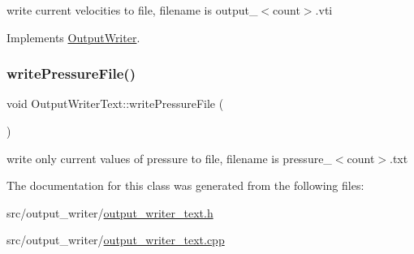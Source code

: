 write current velocities to file, filename is output\+\_\+$<$count$>$.\+vti 



Implements \mbox{\hyperlink{classOutputWriter_ac625c204affdc05919388a3549c2e945}{Output\+Writer}}.

\mbox{\label{classOutputWriterText_a3480b58a23fd158f16d0ef9c1b67cbfd}} 
\subsubsection{\texorpdfstring{writePressureFile()}{writePressureFile()}}
{\footnotesize\ttfamily void Output\+Writer\+Text\+::write\+Pressure\+File (\begin{DoxyParamCaption}{ }\end{DoxyParamCaption})}



write only current values of pressure to file, filename is pressure\+\_\+$<$count$>$.\+txt 



The documentation for this class was generated from the following files\+:\begin{DoxyCompactItemize}
\item 
src/output\+\_\+writer/\mbox{\hyperlink{output__writer__text_8h}{output\+\_\+writer\+\_\+text.\+h}}\item 
src/output\+\_\+writer/\mbox{\hyperlink{output__writer__text_8cpp}{output\+\_\+writer\+\_\+text.\+cpp}}\end{DoxyCompactItemize}
